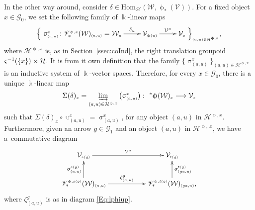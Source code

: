 \documentclass[11pt]{article}
\numberwithin{equation}{section}
\renewcommand{\hom}[3]{\mathrm{Hom}_{\Sscript{#1}}\left(#2, #3\right)}
\newcommand{\Go}{\cG_{\Sscript{0}}}
\newcommand{\Ga}{\cG_{\Sscript{1}}}
\newcommand{\Vx}{\cV_{\Sscript{x}}}
\newcommand{\Wu}{\cW_{\Sscript{u}}}
\newcommand{\Vg}{\cV^{\Sscript{g}}}
\newcommand{\vV}{\mathscr{V}}
\newcommand{\cG}{{\mathcal G}}
\newcommand{\cH}{{\mathcal H}}
\newcommand{\cV}{{\mathcal V}}
\newcommand{\cW}{{\mathcal W}}
\newcommand{\Sscript}[1]{\scriptscriptstyle{#1}}
\newcommand{\injlimit}[2]{\varinjlim_{#1}\left({#2}\right)}
\begin{document}
In the other way around, consider $\delta \in \hom{\cH}{\cW}{\upphi_{*}(\cV)}$. For a fixed object $x \in \Go$, we set the following family of $\Bbbk$-linear maps
\begin{gather}\label{Eq:S}
\Big\{ \xymatrix{ \upsigma^{\Sscript{x}}_{\Sscript{(a, u)}}\colon \vV^{\Sscript{\upphi, x}}_*(\cW)_{\Sscript{(a, u)}} = \Wu
\ar@{->}^-{\delta_u}[r] & \cV_{\Sscript{\upphi(u)}}
\ar@{->}^-{\cV^{\Sscript{a}}}[r] & \Vx } \Big\}_{\Sscript{(a,u) \in \cH^{\Sscript{\upphi, x}}}},
\end{gather}
where $\cH^{\Sscript{\upphi, x}}$ is, as in Section~\ref{ssec:coInd}, the right translation groupoid $\varsigma^{-1}(\{x\})\rJoin \cH$. It is from it own definition that the family $\big\{ \upsigma^{\Sscript{x}}_{\Sscript{(a,
u)}}\big\}_{\Sscript{(a, u) \in \cH^{\Sscript{\upphi, x}}}}$ is an inductive system of $\Bbbk$-vector spaces. Therefore, for every $x \in \Go$, there is a unique $\Bbbk$-linear map
\begin{gather}\label{Eq:SI}
\Sigma(\delta)_{\Sscript{x}} = \injlimit{(a, u) \in \cH^{\Sscript{\upphi,x}}}{\upsigma^{\Sscript{x}}_{\Sscript{(a, u)}}} \colon \
{}^*\upphi(\cW)_{\Sscript{x}} \longrightarrow \Vx
\end{gather}
such that $\Sigma(\delta)_{\Sscript{x}} \circ \upupsilon^{\Sscript{x}}_{\Sscript{(a, u)}} = \upsigma^{\Sscript{x}}_{\Sscript{(a, u)}}$, for any object $(a,u)$ in $\cH^{\Sscript{\upphi,x}}$. Furthermore, given an arrow $g \in
\Ga$ and an object $(a,u)$ in $\cH^{\Sscript{\upphi,\ x}}$, we have a~commutative diagram
\begin{gather}\label{Eq:SII}
\xymatrix@R=25pt{ \cV_{\Sscript{s(g)}} \ar@{->}^-{\Vg}[rr] & &
\cV_{\Sscript{t(g)}} \\ \vV^{\Sscript{\upphi,
s(g)}}_*(\cW)_{\Sscript{(a, u)}}
\ar@{->}^-{\upsigma^{\Sscript{s(g)}}_{\Sscript{(a, u)}}}[u]
\ar@{->}^-{\zeta^g_{(a, u)}}[rr] & &
\ar@{->}_-{\upsigma^{\Sscript{t(g)}}_{\Sscript{(ga, u)}}}[u]
\vV^{\Sscript{\upphi, t(g)}}_*(\cW)_{\Sscript{(ga, u)}}, }
\end{gather}
where $\zeta^g_{(a, u)}$ is as in diagram \eqref{Eq:lphiup}.
\end{document}
